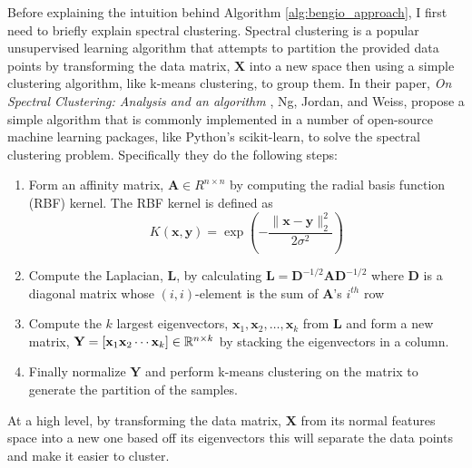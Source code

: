 \documentclass[../thesis.tex]{subfiles}
\begin{document}
Before explaining the intuition behind Algorithm \ref{alg:bengio_approach}, I
first need to briefly explain spectral clustering. Spectral clustering is a
popular unsupervised learning algorithm that attempts to partition the provided
data points by transforming the data matrix, $\mathbf{X}$ into a new space then
using a simple clustering algorithm, like k-means clustering, to group them. In
their paper, \textit{On Spectral Clustering: Analysis and an algorithm}
\cite{ng2002spectral}, Ng, Jordan, and Weiss, propose a simple algorithm that is
commonly implemented in a number of open-source machine learning packages, like
Python's scikit-learn, to solve the spectral clustering problem. Specifically
they do the following steps:
\begin{enumerate}
    \item Form an affinity matrix, $\mathbf{A} \in R^{n \times n}$ by computing
    the radial basis function (RBF) kernel. The RBF kernel is defined as
    \begin{equation}
        \label{eq:rbf-kernel}
        K(\mathbf{x}, \mathbf{y}) = \exp\left(-\frac{\lVert \mathbf{x} -
        \mathbf{y}\rVert_2^2}{2\sigma^2}\right)
    \end{equation}
    \item Compute the Laplacian, $\mathbf{L}$, by calculating $\mathbf{L} =
    \mathbf{D}^{-1/2}\mathbf{A}\mathbf{D}^{-1/2}$ where $\mathbf{D}$ is a
    diagonal matrix whose $(i, i)$-element is the sum of $\mathbf{A}$'s $i^{th}$
    row
    \item Compute the $k$ largest eigenvectors, $\mathbf{x}_1, \mathbf{x}_2,
    \ldots, \mathbf{x}_k$ from $\mathbf{L}$ and form a new matrix, $\mathbf{Y} =
    [\mathbf{x}_1 \mathbf{x}_2 \cdots \mathbf{x}_k] \in \mathbb{R}^{n \times k}$ by
    stacking the eigenvectors in a column.
    \item Finally normalize $\mathbf{Y}$ and perform k-means clustering on the
    matrix to generate the partition of the samples.
\end{enumerate}
At a high level, by transforming the data matrix, $\mathbf{X}$ from its normal
features space into a new one based off its eigenvectors this will separate the
data points and make it easier to cluster.
\end{document}

